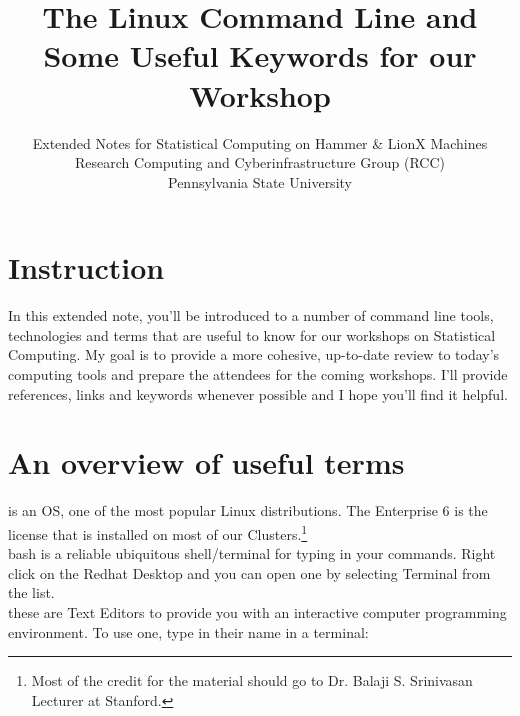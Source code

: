 \documentclass[12pt]{article}
\begin{document}
\title{The Linux Command Line and Some Useful Keywords for our Workshop\\}
\author{
        Extended Notes for Statistical Computing on Hammer \& LionX Machines \\
        Research Computing and Cyberinfrastructure Group (RCC)\\
        Pennsylvania State University\\        
            \and
        }
\date{}
\maketitle

\section{Instruction}
 

In this extended note, you'll be introduced to a number of command line tools, technologies and terms that are useful to know for our workshops on Statistical Computing. My goal is to provide a more cohesive, up-to-date review to today's computing tools and prepare the attendees for the coming workshops. I'll provide references, links and keywords whenever possible and I hope you'll find it helpful. 



\section{An overview of useful terms} 


 is an OS, one of the most popular Linux distributions.  The Enterprise 6 is the license that is installed on most of our Clusters.\footnote{Most of the credit for the material should go to Dr. Balaji S. Srinivasan Lecturer at Stanford.}  \\
  bash is a reliable ubiquitous shell/terminal for typing in your commands. Right click on the Redhat Desktop and you can open one by selecting Terminal from the list.\\
these are Text Editors to provide you with an interactive computer programming environment.  To use one, type in their name in a terminal:\\
\end{document}
